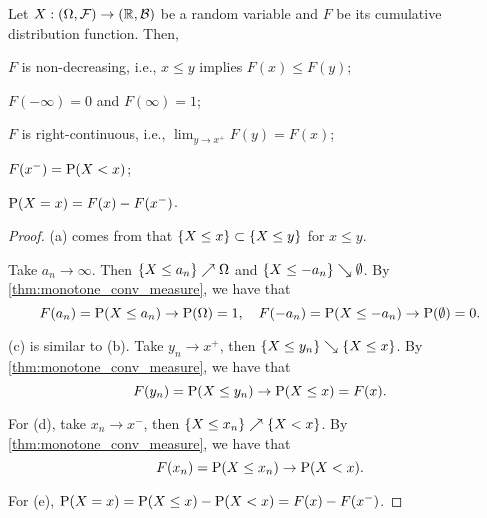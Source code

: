 \begin{proposition}
    Let $X:(\Omega,\F)\to (\R,\B)$ be a random variable and $F$ be 
    its cumulative distribution function. Then, 
    \begin{thmenum}
        \item $F$ is non-decreasing, i.e., $x\leq y$ implies $F(x)\leq F(y)$; 
        \item $F(-\infty) = 0$ and $F(\infty) = 1$; 
        \item $F$ is right-continuous, i.e., $\lim_{y\to x^+} F(y) = F(x)$; 
        \item $F(x^-) = \P(X < x)$; 
        \item $\P(X = x) = F(x) - F(x^-)$.
    \end{thmenum}
\end{proposition}
\begin{proof}
    (a) comes from that $\set{X\leq x}\subset\set{X\leq y}$ for $x\leq y$. 

    Take $a_n\to\infty$. Then $\set{X\leq a_n}\nearrow\Omega$ and 
    $\set{X\leq -a_n}\searrow\emptyset$. By \cref{thm:monotone_conv_measure}, 
    we have that 
    \begin{equation*}
        F(a_n) = \P(X\leq a_n)\to\P(\Omega) = 1,\quad F(-a_n) = \P(X\leq -a_n)\to\P(\emptyset) = 0.
    \end{equation*} 

    (c) is similar to (b). Take $y_n\to x^+$, then $\set{X\leq y_n}\searrow\set{X\leq x}$. 
    By \cref{thm:monotone_conv_measure}, we have that 
    \begin{equation*}
        F(y_n) = \P(X\leq y_n)\to\P(X\leq x) = F(x).
    \end{equation*}

    For (d), take $x_n\to x^-$, then $\set{X \leq x_n}\nearrow\set{X < x}$. 
    By \cref{thm:monotone_conv_measure}, we have that
    \begin{equation*}
        F(x_n) = \P(X\leq x_n)\to\P(X < x).
    \end{equation*}

    For (e), $\P(X = x) = \P(X\leq x) - \P(X < x) = F(x) - F(x^-)$.
\end{proof}

